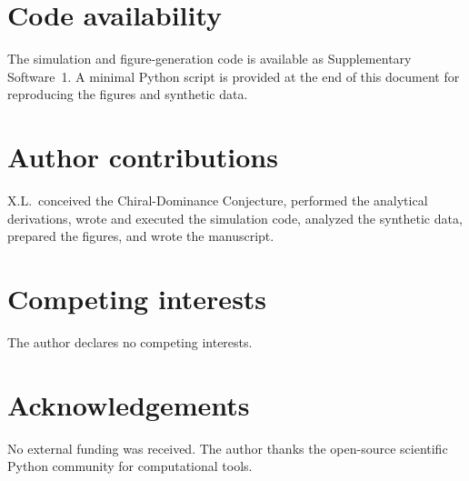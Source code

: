 \documentclass[11pt,a4paper]{article}
\begin{document}
\section*{Code availability}

The simulation and figure-generation code is available as Supplementary Software~1. A minimal Python script is provided at the end of this document for reproducing the figures and synthetic data.

\section*{Author contributions}

X.L.\ conceived the Chiral-Dominance Conjecture, performed the analytical derivations, wrote and executed the simulation code, analyzed the synthetic data, prepared the figures, and wrote the manuscript.

\section*{Competing interests}

The author declares no competing interests.

\section*{Acknowledgements}

No external funding was received. The author thanks the open-source scientific Python community for computational tools.
\end{document}
